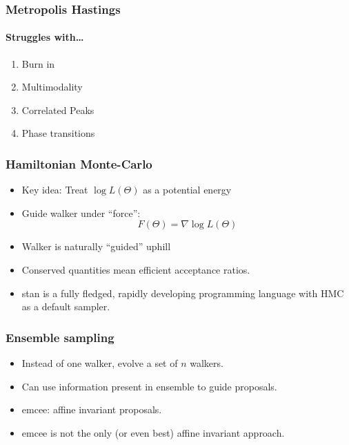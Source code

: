 \documentclass[%
]{beamer}
\begin{document}
\begin{frame}
  \frametitle{Metropolis Hastings} 
  \framesubtitle{Struggles with\ldots}
  \pause
  \begin{enumerate}
      \item Burn in
      \item Multimodality
      \item Correlated Peaks
      \item Phase transitions
  \end{enumerate}
\end{frame}

\begin{frame}
  \frametitle{Hamiltonian Monte-Carlo} 
  \begin{itemize}
      \item Key idea: Treat $\log L(\Theta)$ as a potential energy
      \item Guide walker under ``force'': \[F(\Theta) =\nabla \log L(\Theta)\]
      \item Walker is naturally ``guided'' uphill
      \item Conserved quantities mean efficient acceptance ratios.
      \item stan is a fully fledged, rapidly developing programming language with HMC as a default sampler.
  \end{itemize}
\end{frame}


\begin{frame}
  \frametitle{Ensemble sampling} 
  \begin{itemize}
      \item Instead of one walker, evolve a set of $n$ walkers.
      \item Can use information present in ensemble to guide proposals.
      \item emcee: affine invariant proposals.
      \item emcee is not the only (or even best) affine invariant approach.
  \end{itemize}
\end{frame}
\end{document}
